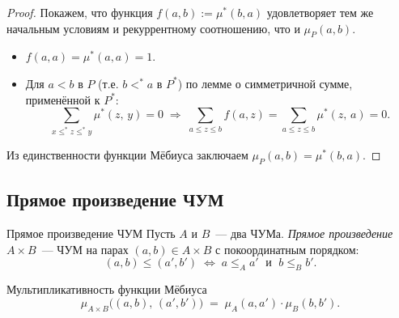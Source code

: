 \begin{proof}
	Покажем, что функция $f(a,b) := \mu^*(b,a)$ удовлетворяет тем же начальным условиям
	и рекуррентному соотношению, что и $\mu_P(a,b)$.
	\begin{itemize}
		\item $f(a,a) = \mu^*(a,a) = 1$.\;\checkmark
		\item Для $a < b$ в $P$ (т.е. $b <^* a$ в $P^*$) по лемме о симметричной сумме,
		применённой к $P^*$:
		\[
		\sum_{x \leq^* z \leq^* y}\mu^*(z,\,y) = 0
		\;\Longrightarrow\;
		\sum_{a \leq z \leq b}f(a,z)
		= \sum_{a \leq z \leq b}\mu^*(z,\,a) = 0.
		\]
	\end{itemize}
	Из единственности функции Мёбиуса заключаем $\mu_P(a,b) = \mu^*(b,a)$.
\end{proof}

\subsection{Прямое произведение ЧУМ}

\begin{Definition}{Прямое произведение ЧУМ}{}
	Пусть $A$ и $B$~--- два ЧУМа. \emph{Прямое произведение} $A \times B$~---
	ЧУМ на парах $(a,b) \in A\times B$ с покоординатным порядком:
	\[
	(a,b) \leq (a',b')
	\;\Longleftrightarrow\;
	a \leq_A a' \;\text{ и }\; b \leq_B b'.
	\]
\end{Definition}

\begin{Theorem}{Мультипликативность функции Мёбиуса}{}
	\[
	\mu_{A\times B}\!\bigl((a,b),\,(a',b')\bigr)
	\;=\;
	\mu_A(a,a')\cdot\mu_B(b,b').
	\]
\end{Theorem}


